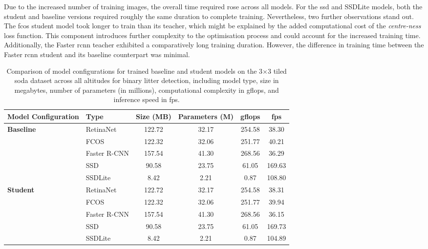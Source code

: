 Due to the increased number of training images, the overall time required rose across all models. For the \gls{ssd} and SSDLite models, both the student and baseline versions required roughly the same duration to complete training. Nevertheless, two further observations stand out. The \gls{fcos} student model took longer to train than its teacher, which might be explained by the added computational cost of the \textit{centre-ness} loss function. This component introduces further complexity to the optimisation process and could account for the increased training time. Additionally, the Faster \gls{rcnn} teacher exhibited a comparatively long training duration. However, the difference in training time between the Faster \gls{rcnn} student and its baseline counterpart was minimal.

\begin{table}[ht]
    \centering
    \begin{adjustbox}{width=\textwidth}
    \begin{tabular}{llcccc}
        \toprule
        \textbf{Model Configuration} & \textbf{Type} & \textbf{Size (MB)} & \textbf{Parameters (M)} & \textbf{\gls{gflops}} & \textbf{\gls{fps}} \\
        \midrule
        \multirow{5}{*}{\textbf{Baseline}} 
            & RetinaNet   & 122.72 & 32.17 & 254.58 & 38.30 \\
            & FCOS        & 122.32 & 32.06 & 251.77 & 40.21 \\
            & Faster R-CNN & 157.54 & 41.30 & 268.56 & 36.29 \\
            & SSD         & 90.58  & 23.75 & 61.05 & 169.63 \\
            & SSDLite     & 8.42   & 2.21 & 0.87 & 108.80\\
        \midrule
        \multirow{5}{*}{\textbf{Student}} 
            & RetinaNet   & 122.72 & 32.17 & 254.58 & 38.31 \\
            & FCOS        & 122.32 & 32.06 & 251.77 & 39.94 \\
            & Faster R-CNN & 157.54 & 41.30 & 268.56 & 36.15 \\
            & SSD         & 90.58  & 23.75 & 61.05 & 169.73 \\
            & SSDLite     & 8.42   & 2.21 & 0.87 & 104.89\\
        \bottomrule
    \end{tabular}
    \end{adjustbox}
    \caption{Comparison of model configurations for trained baseline and student models on the 3$\times$3 tiled \gls{soda} dataset across all altitudes for binary litter detection, including model type, size in megabytes, number of parameters (in millions), computational complexity in \gls{gflops}, and inference speed in \gls{fps}.}
    \label{tab:model_configs_soda_tiled_single}
\end{table}

